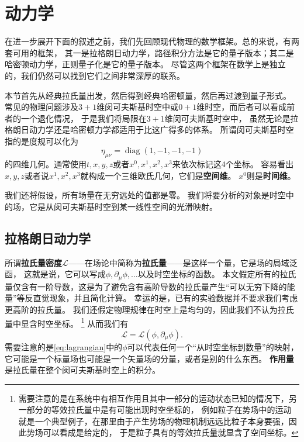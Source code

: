 \documentclass[UTF8, a4paper]{ctexart}
\DeclareMathOperator{\diag}{diag}
\begin{document}
\section{动力学}

在进一步展开下面的叙述之前，我们先回顾现代物理的数学框架。总的来说，有两套可用的框架，
其一是拉格朗日动力学，路径积分方法是它的量子版本；其二是哈密顿动力学，正则量子化是它的量子版本。
尽管这两个框架在数学上是独立的，我们仍然可以找到它们之间非常深厚的联系。

本节首先从经典拉氏量出发，然后得到经典哈密顿量，然后再过渡到量子形式。
常见的物理问题涉及$3+1$维闵可夫斯基时空中或$0+1$维时空，而后者可以看成前者的一个退化情况，
于是我们将局限在$3+1$维闵可夫斯基时空中，
虽然无论是拉格朗日动力学还是哈密顿力学都适用于比这广得多的体系。
所谓闵可夫斯基时空指的是度规可以化为
\begin{equation}
    \eta_{\mu\nu} = \diag (1, -1, -1, -1)
\end{equation}
的四维几何。通常使用$t, x, y, z$或者$x^0, x^1, x^2, x^3$来依次标记这4个坐标。
容易看出$x, y, z$或者说$x^1, x^2, x^3$就构成一个三维欧氏几何，它们是\textbf{空间维}。
$x^0$则是\textbf{时间维}。

我们还将假设，所有场量在无穷远处的值都是零。
我们将要分析的对象是时空中的场，它是从闵可夫斯基时空到某一线性空间的光滑映射。

\subsection{拉格朗日动力学}

所谓\textbf{拉氏量密度}$\mathcal{L}$——在场论中简称为\textbf{拉氏量}——是这样一个量，它是场的局域泛函，
这就是说，它可以写成$\phi, \partial_\mu \phi, \ldots$以及时空坐标的函数。
本文假定所有的拉氏量仅含有一阶导数，这是为了避免含有高阶导数的拉氏量产生“可以无穷下降的能量”等反直觉现象，并且简化计算。
幸运的是，已有的实验数据并不要求我们考虑更高阶的拉氏量。
我们还假定物理规律在时空上是均匀的，因此我们不认为拉氏量中显含时空坐标。%
\footnote{
    需要注意的是在系统中有相互作用且其中一部分的运动状态已知的情况下，另一部分的等效拉氏量中是有可能出现时空坐标的，
    例如粒子在势场中的运动就是一个典型例子，在那里由于产生势场的物理机制远远比粒子本身要强，因此势场可以看成是给定的，
    于是粒子具有的等效拉氏量就显含了空间坐标。}%
从而我们有
\begin{equation}
    \mathcal{L} = \mathcal{L}(\phi, \partial_\mu \phi).
    \label{eq:lagrangian}
\end{equation}
需要注意的是\eqref{eq:lagrangian}中的$\phi$可以代表任何一个“从时空坐标到数量”的映射，
它可能是一个标量场也可能是一个矢量场的分量，或者是别的什么东西。
\textbf{作用量}是拉氏量在整个闵可夫斯基时空上的积分。
\end{document}

